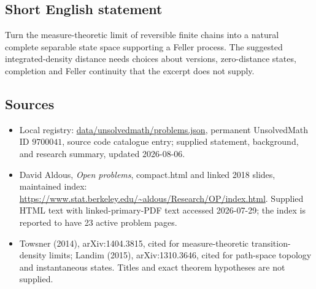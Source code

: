 \documentclass[11pt]{article}
\begin{document}
\subsection{Short English statement}
Turn the measure-theoretic limit of reversible finite chains into a natural complete separable state space supporting a Feller process. The suggested integrated-density distance needs choices about versions, zero-distance states, completion and Feller continuity that the excerpt does not supply.
\subsection{Sources}
\begin{itemize}
\item Local registry: \url{data/unsolvedmath/problems.json}, permanent UnsolvedMath ID \(9700041\), source code catalogue entry; supplied statement, background, and research summary, updated 2026-08-06.
\item David Aldous, \emph{Open problems}, compact.html and linked 2018 slides, maintained index: \url{https://www.stat.berkeley.edu/~aldous/Research/OP/index.html}. Supplied HTML text with linked-primary-PDF text accessed 2026-07-29; the index is reported to have 23 active problem pages.
\item Towsner (2014), arXiv:1404.3815, cited for measure-theoretic transition-density limits; Landim (2015), arXiv:1310.3646, cited for path-space topology and instantaneous states. Titles and exact theorem hypotheses are not supplied.
\end{itemize}
\end{document}
